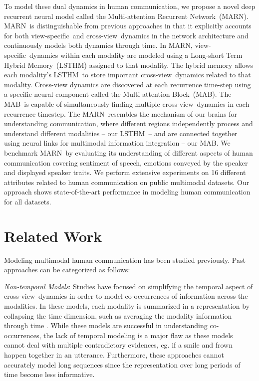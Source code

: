\documentclass[letterpaper]{article} \usepackage{aaai18}  \usepackage{times}  \usepackage{helvet}  \usepackage{courier}  \usepackage{url}  \usepackage{graphicx}  \usepackage{multirow}
\newcommand{\pipeline}{Multi-attention Recurrent Network}
\newcommand{\pipelines}{MARN}
\newcommand{\mab}{Multi-attention Block}
\newcommand{\mabs}{MAB}
\newcommand{\intra}{view-specific}
\newcommand{\inter}{cross-view}
\newcommand{\tname}{Long-short Term Hybrid Memory}
\newcommand{\tnames}{LSTHM}
\begin{document}
To model these dual dynamics in human communication, we propose a novel deep recurrent neural model called the \pipeline \ (\pipelines). \pipelines \ is distinguishable from previous approaches in that it explicitly accounts for both \intra \ and \inter \ dynamics in the network architecture and continuously models both dynamics through time. In \pipelines, \intra \ dynamics within each modality are modeled using a \tname \ (\tnames) assigned to that modality. The hybrid memory allows each modality's \tnames \ to store important \inter \ dynamics related to that modality. Cross-view dynamics are discovered at each recurrence time-step using a specific neural component called the \mab \ (\mabs). The \mabs \ is capable of simultaneously finding multiple \inter \ dynamics in each recurrence timestep. The \pipelines \ resembles the mechanism of our brains for understanding communication, where different regions independently process and understand different modalities \cite{KUZMANOVIC2012179,Sergent55} -- our \tnames \ -- and are connected together using neural links for multimodal information integration \cite{Jiang16064} -- our \mabs. We benchmark \pipelines \ by evaluating its understanding of different aspects of human communication covering sentiment of speech, emotions conveyed by the speaker and displayed speaker traits. We perform extensive experiments on 16 different attributes related to human communication on public multimodal datasets. Our approach shows state-of-the-art performance in modeling human communication for all datasets. 

\section{Related Work}
\label{Related Work}
Modeling multimodal human communication has been studied previously. Past approaches can be categorized as follows:

\textit{Non-temporal Models}: Studies have focused on simplifying the temporal aspect of  \inter \ dynamics \cite{contextmultimodalacl2017,perez2013utterance,wollmer2013youtube} in order to model co-occurrences of information across the modalities. In these models, each modality is summarized in a representation by collapsing the time dimension, such as averaging the modality information through time \cite{abburi2016multimodal}. While these models are successful in understanding co-occurrences, the lack of temporal modeling is a major flaw as these models cannot deal with multiple contradictory evidences, eg. if a smile and frown happen together in an utterance. Furthermore, these approaches cannot accurately model long sequences since the representation over long periods of time become less informative. 
\end{document}

